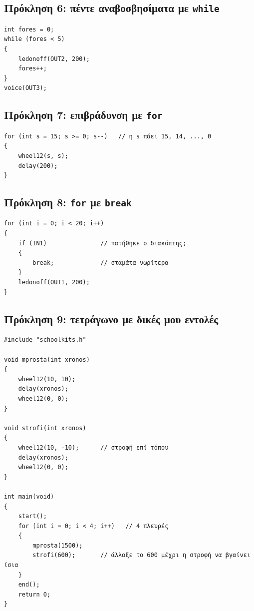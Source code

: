 \documentclass[11pt,a4paper]{article}
\begin{document}
\subsection*{Πρόκληση 6: πέντε αναβοσβησίματα με \texttt{while}}
\begin{lstlisting}
int fores = 0;
while (fores < 5)
{
    ledonoff(OUT2, 200);
    fores++;
}
voice(OUT3);
\end{lstlisting}

\subsection*{Πρόκληση 7: επιβράδυνση με \texttt{for}}
\begin{lstlisting}
for (int s = 15; s >= 0; s--)   // η s πάει 15, 14, ..., 0
{
    wheel12(s, s);
    delay(200);
}
\end{lstlisting}

\subsection*{Πρόκληση 8: \texttt{for} με \texttt{break}}
\begin{lstlisting}
for (int i = 0; i < 20; i++)
{
    if (IN1)               // πατήθηκε ο διακόπτης;
    {
        break;             // σταμάτα νωρίτερα
    }
    ledonoff(OUT1, 200);
}
\end{lstlisting}

\subsection*{Πρόκληση 9: τετράγωνο με δικές μου εντολές}
\begin{lstlisting}
#include "schoolkits.h"

void mprosta(int xronos)
{
    wheel12(10, 10);
    delay(xronos);
    wheel12(0, 0);
}

void strofi(int xronos)
{
    wheel12(10, -10);      // στροφή επί τόπου
    delay(xronos);
    wheel12(0, 0);
}

int main(void)
{
    start();
    for (int i = 0; i < 4; i++)   // 4 πλευρές
    {
        mprosta(1500);
        strofi(600);       // άλλαξε το 600 μέχρι η στροφή να βγαίνει ίσια
    }
    end();
    return 0;
}
\end{lstlisting}
\end{document}

